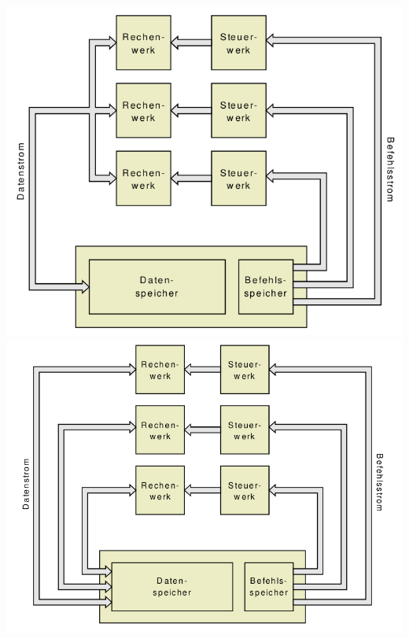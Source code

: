 \documentclass[a4paper]{article}
\begin{document}
\begin{multicols}{3}
\begin{center}
    \includegraphics[width=\textwidth/13]{Assets/RA2_MISD.png}
    \includegraphics[width=\textwidth/13]{Assets/RA2_MIMD.png}
  \end{center}
  
  
  

\end{multicols}
\end{document}
